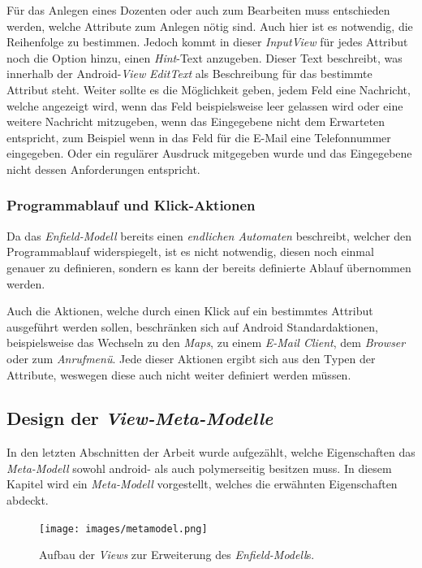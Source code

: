 Für das Anlegen eines Dozenten oder auch zum Bearbeiten muss entschieden werden, welche Attribute zum Anlegen nötig sind. Auch hier ist es notwendig, die Reihenfolge zu bestimmen. Jedoch kommt in dieser \textit{InputView} für jedes Attribut noch die Option hinzu, einen \textit{Hint}-Text anzugeben. Dieser Text beschreibt, was innerhalb der Android-\textit{View} \textit{EditText} als Beschreibung für das bestimmte Attribut steht. Weiter sollte es die Möglichkeit geben, jedem Feld eine Nachricht, welche angezeigt wird, wenn das Feld beispielsweise leer gelassen wird oder eine weitere Nachricht mitzugeben, wenn das Eingegebene nicht dem Erwarteten entspricht, zum Beispiel wenn in das Feld für die E-Mail eine Telefonnummer eingegeben. Oder ein regulärer Ausdruck mitgegeben wurde und das Eingegebene nicht dessen Anforderungen entspricht.

\subsubsection{Programmablauf und Klick-Aktionen}

Da das \textit{Enfield-Modell} bereits einen \textit{endlichen Automaten} beschreibt, welcher den Programmablauf widerspiegelt, ist es nicht notwendig, diesen noch einmal genauer zu definieren, sondern es kann der bereits definierte Ablauf übernommen werden.

Auch die Aktionen, welche durch einen Klick auf ein bestimmtes Attribut ausgeführt werden sollen, beschränken sich auf Android Standardaktionen, beispielsweise das Wechseln zu den \textit{Maps}, zu einem \textit{E-Mail Client}, dem \textit{Browser} oder zum \textit{Anrufmenü}. Jede dieser Aktionen ergibt sich aus den Typen der Attribute, weswegen diese auch nicht weiter definiert werden müssen.

\subsection{Design der \textit{View-Meta-Modelle}} \label{sec:resourceViews}

In den letzten Abschnitten der Arbeit wurde aufgezählt, welche Eigenschaften das \textit{Meta-Modell} sowohl android- als auch polymerseitig besitzen muss. In diesem Kapitel wird ein \textit{Meta-Modell} vorgestellt, welches die erwähnten Eigenschaften abdeckt.


\begin{figure}[H]
	\begin{center}
		\texttt{[image: images/metamodel.png]}
		\caption{Aufbau der \textit{Views} zur Erweiterung des \textit{Enfield-Modell}s.}
		\label{fig:meta-model}
	\end{center}
\end{figure}

